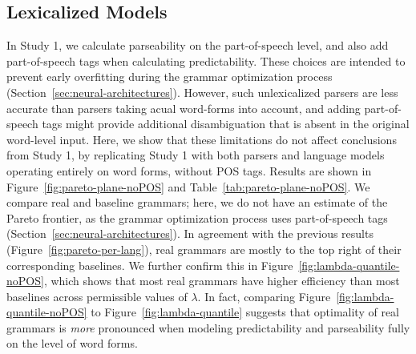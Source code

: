 \documentclass[10pt,twoside,lineno]{article}
\begin{document}
\subsection{Lexicalized Models}


In Study 1, we calculate parseability on the part-of-speech level, and also add part-of-speech tags when calculating predictability.
These choices are intended to prevent early overfitting during the grammar optimization process (Section~\ref{sec:neural-architectures}).
However, such unlexicalized parsers are less accurate than parsers taking acual word-forms into account, and adding part-of-speech tags might provide additional disambiguation that is absent in the original word-level input.
Here, we show that these limitations do not affect conclusions from Study 1, by replicating Study 1 with both parsers and language models operating entirely on word forms, without POS tags.
Results are shown in Figure~\ref{fig:pareto-plane-noPOS} and Table~\ref{tab:pareto-plane-noPOS}.
We compare real and baseline grammars; here, we do not have an estimate of the Pareto frontier, as the grammar optimization process uses part-of-speech tags (Section~\ref{sec:neural-architectures}).
In agreement with the previous results (Figure~\ref{fig:pareto-per-lang}), real grammars are mostly to the top right of their corresponding baselines.
We further confirm this in Figure~\ref{fig:lambda-quantile-noPOS}, which shows that most real grammars have higher efficiency than most baselines across permissible values of $\lambda$.
In fact, comparing Figure~\ref{fig:lambda-quantile-noPOS} to Figure~\ref{fig:lambda-quantile} suggests that optimality of real grammars is \emph{more} pronounced when modeling predictability and parseability fully on the level of word forms.
\end{document}
